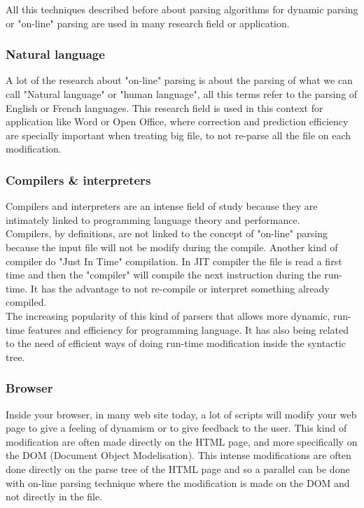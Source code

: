 All this techniques described before about parsing algorithms for dynamic parsing or "on-line" parsing are used in many research field or application.

\subsubsection{Natural language}
A lot of the research about "on-line" parsing is about the parsing of what we can call "Natural language" or "human language", all this terms refer to the parsing of English or French languages. This research field is used in this context for application like Word or Open Office, where correction and prediction efficiency are specially important when treating big file, to not re-parse all the file on each modification.

\subsubsection{Compilers \& interpreters}
Compilers and interpreters are an intense field of study because they are intimately linked to programming language theory and performance.\\
Compilers, by definitions, are not linked to the concept of "on-line" parsing because the input file will not be modify during the compile. Another kind of compiler do "Just In Time" compilation. In JIT compiler the file is read a first time and then the "compiler" will compile the next instruction during the run-time. It has the advantage to not re-compile or interpret something already compiled.\\
The increasing popularity of this kind of parsers that allows more dynamic, run-time features and efficiency for programming language. It has also being related to the need of efficient ways of doing run-time modification inside the syntactic tree.

\subsubsection{Browser}
Inside your browser, in many web site today, a lot of scripts will modify your web page to give a feeling of dynamism or to give feedback to the user. This kind of modification are often made directly on the HTML page, and more specifically on the DOM (Document Object Modelisation). This intense modifications are often done directly on the parse tree of the HTML page and so a parallel can be done with on-line parsing technique where the modification is made on the DOM and not directly in the file.
